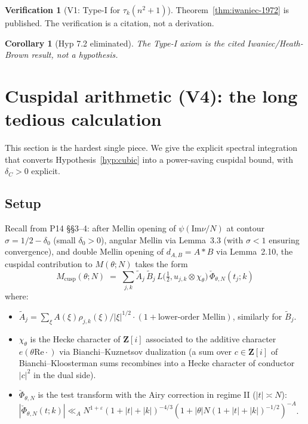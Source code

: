 \documentclass[11pt]{article}
\newtheorem{corollary}[theorem]{Corollary}
\theoremstyle{definition}
\newtheorem{verification}[theorem]{Verification}
\newcommand{\Z}{\mathbf{Z}}
\newcommand{\Zi}{\Z[i]}
\renewcommand{\Re}{\mathrm{Re}}
\renewcommand{\Im}{\mathrm{Im}}
\begin{document}
\begin{verification}[V1: Type-I for $\tau_k(n^2+1)$]\label{ver:V1}
Theorem~\ref{thm:iwaniec-1972} is published. The verification is a citation, not a derivation.
\end{verification}

\begin{corollary}[Hyp 7.2 eliminated]\label{cor:elim-typeI}
The Type-I axiom is the cited Iwaniec/Heath-Brown result, not a hypothesis.
\end{corollary}

\section{Cuspidal arithmetic (V4): the long tedious calculation}\label{sec:cuspidal-V4}

This section is the hardest single piece. We give the explicit spectral integration that converts Hypothesis~\ref{hyp:cubic} into a power-saving cuspidal bound, with $\delta_C>0$ explicit.

\subsection{Setup}\label{ssec:V4-setup}

Recall from P14 §§3--4: after Mellin opening of $\psi(\Im\nu/N)$ at contour $\sigma=1/2-\delta_0$ (small $\delta_0>0$), angular Mellin via Lemma~3.3 (with $\sigma<1$ ensuring convergence), and double Mellin opening of $d_{A,B}=A*B$ via Lemma~2.10, the cuspidal contribution to $M(\theta;N)$ takes the form
\begin{equation}\label{eq:M-cusp-explicit}
   M_{\mathrm{cusp}}(\theta;N)\;=\;\sum_{j,k}\widetilde A_j\,\widetilde B_j\,L\bigl(\tfrac12,u_{j,k}\otimes\chi_\theta\bigr)\,\check\Phi_{\theta,N}(t_j;k)
\end{equation}
where:
\begin{itemize}
\item $\widetilde A_j=\sum_\xi A(\xi)\rho_{j,k}(\xi)/|\xi|^{1/2}\cdot(1+\text{lower-order Mellin})$, similarly for $\widetilde B_j$.
\item $\chi_\theta$ is the Hecke character of $\Zi$ associated to the additive character $e(\theta\Re\cdot)$ via Bianchi--Kuznetsov dualization (a sum over $c\in\Zi$ of Bianchi--Kloosterman sums recombines into a Hecke character of conductor $|c|^2$ in the dual side).
\item $\check\Phi_{\theta,N}$ is the test transform with the Airy correction in regime II ($|t|\asymp N$): $|\check\Phi_{\theta,N}(t;k)|\ll_A N^{1+\varepsilon}(1+|t|+|k|)^{-4/3}(1+|\theta|N(1+|t|+|k|)^{-1/2})^{-A}$.
\end{itemize}
\end{document}
